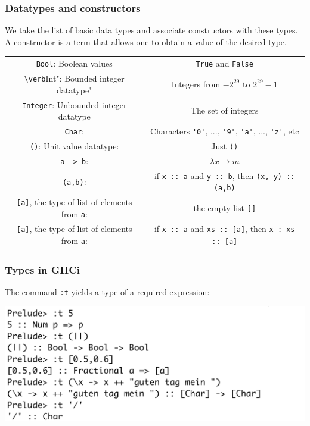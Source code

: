 \documentclass[10pt,pdf,utf8,russian,aspectratio=169]{beamer}
\begin{document}
\begin{frame}
  \frametitle{Datatypes and constructors}
 We take the list of basic data types and associate constructors with these types. A constructor is a term that allows one to obtain a value of the desired type.
\begin{center}
\begin{tabular}{ |c|c| }
\hline
\verb"Bool": Boolean values & \verb"True" and \verb"False" \\
\verb"\verb"Int": Bounded integer datatype" & Integers from $-2^{29}$ to $2^{29} - 1$ \\
\verb"Integer": Unbounded integer datatype & The set of integers \\
\verb"Char": & Characters \verb"'0'", ..., \verb"'9'", \verb"'a'", ..., \verb"'z'", etc \\
\verb"()": Unit value datatype: & Just \verb"()" \\
\verb"a -> b": & $\lambda x \rightarrow m$ \\
\verb"(a,b)": & if \verb"x :: a" and \verb"y :: b", then \verb"(x, y) :: (a,b)" \\
\verb"[a]", the type of list of elements from \verb"a": & the empty list \verb"[]" \\
\verb"[a]", the type of list of elements from \verb"a": & if \verb"x :: a" and \verb"xs :: [a]", then \verb"x : xs :: [a]" \\
\hline
\end{tabular}
\end{center}
\end{frame}

\begin{frame}
  \frametitle{Types in GHCi}

  The command \verb":t" yields a type of a required expression:

  \begin{center}
  \includegraphics[scale=0.5]{Pics/TypesScreen.png}
  \end{center}

\end{frame}
\end{document}

